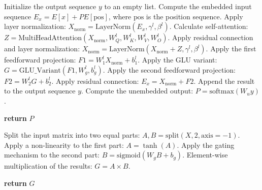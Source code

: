 \documentclass{article}
\begin{document}
\begin{algorithm}
\begin{algorithmic}[1]
\State Initialize the output sequence $y$ to an empty list.
\State Compute the embedded input sequence $E_x = E[x] + PE[\text{pos}]$, where $\text{pos}$ is the position sequence.
    \State Apply layer normalization: $X_{\text{norm}} = \text{LayerNorm}(E_x, \gamma^l, \beta^l)$.
    \State Calculate self-attention: $Z = \text{MultiHeadAttention}(X_{\text{norm}}, W_Q^l, W_K^l, W_V^l, W_O^l)$.
    \State Apply residual connection and layer normalization: $X_{\text{norm}} = \text{LayerNorm}(X_{\text{norm}} + Z, \gamma^l, \beta^l)$.
    \State Apply the first feedforward projection: $F1 = W_1^lX_{\text{norm}} + b_1^l$.
    \State Apply the GLU variant: $G = \text{GLU\_Variant}(F1, W_g^l, b_g^l)$.
    \State Apply the second feedforward projection: $F2 = W_2^lG + b_2^l$.
    \State Apply residual connection: $E_x = X_{\text{norm}} + F2$.
    \State Append the result to the output sequence $y$.
\EndFor
\State Compute the unembedded output: $P = \text{softmax}(W_uy)$.

\State \textbf{return} $P$

    \State Split the input matrix into two equal parts: $A, B = \text{split}(X, 2, \text{axis}=-1)$.
    \State Apply a non-linearity to the first part: $A = \tanh(A)$.
    \State Apply the gating mechanism to the second part: $B = \text{sigmoid}(W_gB + b_g)$.
    \State Element-wise multiplication of the results: $G = A \times B$.

    \State \textbf{return} $G$
\EndFunction

\end{algorithmic}
\end{algorithm}
\end{document}
